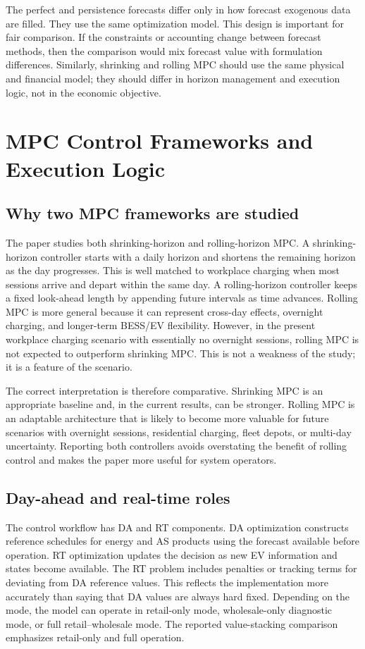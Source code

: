 \documentclass[final,5p,times]{elsarticle}
\begin{document}
The perfect and persistence forecasts differ only in how forecast exogenous data are filled. They use the same optimization model. This design is important for fair comparison. If the constraints or accounting change between forecast methods, then the comparison would mix forecast value with formulation differences. Similarly, shrinking and rolling MPC should use the same physical and financial model; they should differ in horizon management and execution logic, not in the economic objective.

\section{MPC Control Frameworks and Execution Logic}
\label{sec:mpc_frameworks}

\subsection{Why two MPC frameworks are studied}
The paper studies both shrinking-horizon and rolling-horizon MPC. A shrinking-horizon controller starts with a daily horizon and shortens the remaining horizon as the day progresses. This is well matched to workplace charging when most sessions arrive and depart within the same day. A rolling-horizon controller keeps a fixed look-ahead length by appending future intervals as time advances. Rolling MPC is more general because it can represent cross-day effects, overnight charging, and longer-term BESS/EV flexibility. However, in the present workplace charging scenario with essentially no overnight sessions, rolling MPC is not expected to outperform shrinking MPC. This is not a weakness of the study; it is a feature of the scenario.

The correct interpretation is therefore comparative. Shrinking MPC is an appropriate baseline and, in the current results, can be stronger. Rolling MPC is an adaptable architecture that is likely to become more valuable for future scenarios with overnight sessions, residential charging, fleet depots, or multi-day uncertainty. Reporting both controllers avoids overstating the benefit of rolling control and makes the paper more useful for system operators.

\subsection{Day-ahead and real-time roles}
The control workflow has DA and RT components. DA optimization constructs reference schedules for energy and AS products using the forecast available before operation. RT optimization updates the decision as new EV information and states become available. The RT problem includes penalties or tracking terms for deviating from DA reference values. This reflects the implementation more accurately than saying that DA values are always hard fixed. Depending on the mode, the model can operate in retail-only mode, wholesale-only diagnostic mode, or full retail--wholesale mode. The reported value-stacking comparison emphasizes retail-only and full operation.
\end{document}

